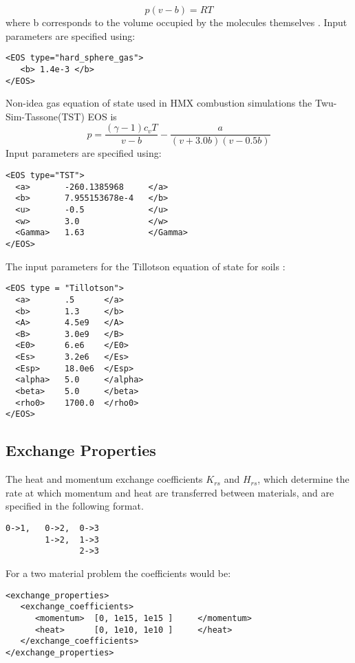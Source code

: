 \begin{equation}
  p(v - b) = RT
\end{equation}
%
where b corresponds to the volume occupied by the molecules themselves \cite{ref:thompson}.
Input parameters are specified using:
%
\begin{Verbatim}[fontsize=\footnotesize]
<EOS type="hard_sphere_gas">
   <b> 1.4e-3 </b>
</EOS>
\end{Verbatim}
%
%
Non-idea gas equation of state used in HMX combustion simulations the Twu-Sim-Tassone(TST) EOS
is
\begin{equation}
  p = \frac{ (\gamma -1)c_v T }{ v - b} - \frac{ a }{(v+3.0b)(v-0.5b)}
\end{equation}
%
Input parameters are specified using:
%
\begin{Verbatim}[fontsize=\footnotesize]
<EOS type="TST">
  <a>       -260.1385968     </a>
  <b>       7.955153678e-4   </b>
  <u>       -0.5             </u>
  <w>       3.0              </w>
  <Gamma>   1.63             </Gamma>
</EOS>
\end{Verbatim}
%
%
The input parameters for the Tillotson equation of state \cite{ref:gathers} for soils :
%
\begin{Verbatim}[fontsize=\footnotesize]
<EOS type = "Tillotson">
  <a>       .5      </a>
  <b>       1.3     </b>
  <A>       4.5e9   </A>
  <B>       3.0e9   </B>
  <E0>      6.e6    </E0>
  <Es>      3.2e6   </Es>
  <Esp>     18.0e6  </Esp>
  <alpha>   5.0     </alpha>
  <beta>    5.0     </beta>
  <rho0>    1700.0  </rho0>
</EOS>
\end{Verbatim}
%
\subsection{Exchange Properties}
The heat and momentum exchange coefficients $K_{rs}$ and $H_{rs}$, which
determine the rate at which momentum and heat are transferred between
materials, and are specified in the following format.
%
\begin{Verbatim}[fontsize=\footnotesize]
0->1,   0->2,  0->3
        1->2,  1->3
               2->3
\end{Verbatim}
%
For a two material problem the coefficients would be:
%
\begin{Verbatim}[fontsize=\footnotesize]
<exchange_properties> 
   <exchange_coefficients>
      <momentum>  [0, 1e15, 1e15 ]     </momentum>
      <heat>      [0, 1e10, 1e10 ]     </heat>  
   </exchange_coefficients>
</exchange_properties>
\end{Verbatim}
%
%
